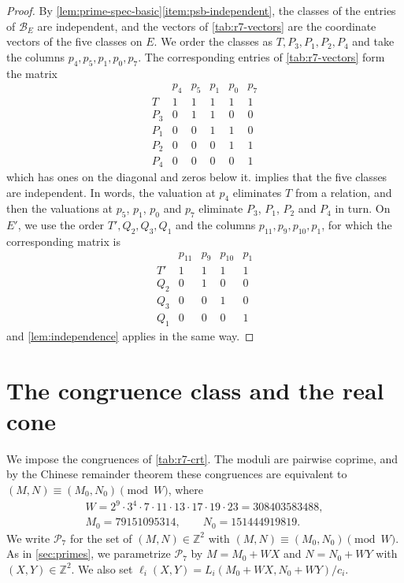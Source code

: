\documentclass[12pt,oneside,openany]{book}
\theoremstyle{definition}
\theoremstyle{plain}
\numberwithin{equation}{chapter}
\theoremstyle{plain}
\theoremstyle{definition}
\theoremstyle{remark}
\newcommand{\Z}{\mathbb Z}
\newcommand{\cB}{\mathcal B}
\newcommand{\cP}{\mathcal P}
\begin{document}
\begin{proof}
By \cref{lem:prime-spec-basic}\ref{item:psb-independent}, the classes of
the entries of $\cB_E$ are independent, and the vectors of
\cref{tab:r7-vectors} are the coordinate vectors of the five classes on
$E$. We order the classes as $T,P_3,P_1,P_2,P_4$ and take the columns
$p_4,p_5,p_1,p_0,p_7$. The
corresponding entries of \cref{tab:r7-vectors} form the matrix
\[
\begin{array}{c|ccccc}
 & p_4 & p_5 & p_1 & p_0 & p_7\\\hline
 T & 1 & 1 & 1 & 1 & 1\\
 P_3 & 0 & 1 & 1 & 0 & 0\\
 P_1 & 0 & 0 & 1 & 1 & 0\\
 P_2 & 0 & 0 & 0 & 1 & 1\\
 P_4 & 0 & 0 & 0 & 0 & 1
\end{array}
\]
which has ones on the diagonal and zeros below it. 
implies that the five classes are independent. In words, the valuation at
$p_4$ eliminates $T$ from a relation, and then the valuations at $p_5$,
$p_1$, $p_0$ and $p_7$ eliminate $P_3$, $P_1$, $P_2$ and $P_4$ in turn. On $E'$,
we use the order $T',Q_2,Q_3,Q_1$ and the columns $p_{11},p_9,p_{10},p_1$,
for which the corresponding matrix is
\[
\begin{array}{c|cccc}
 & p_{11} & p_9 & p_{10} & p_1\\\hline
 T' & 1 & 1 & 1 & 1\\
 Q_2 & 0 & 1 & 0 & 0\\
 Q_3 & 0 & 0 & 1 & 0\\
 Q_1 & 0 & 0 & 0 & 1
\end{array}
\]
and \cref{lem:independence} applies in the same way.
\end{proof}

\section{The congruence class and the real cone}\label{sec:r7-progression}

We impose the congruences of \cref{tab:r7-crt}. The moduli are pairwise
coprime, and by the Chinese remainder theorem these congruences are
equivalent to $(M,N)\equiv(M_0,N_0)\pmod W$, where
\begin{equation}\label{r7:crt}
\begin{gathered}
 W=2^9\cdot3^4\cdot7\cdot11\cdot13\cdot17\cdot19\cdot23=308403583488,\\
 M_0=79151095314,\qquad N_0=151444919819.
\end{gathered}
\end{equation}
We write $\cP_7$ for the set of $(M,N)\in\Z^2$ with
$(M,N)\equiv(M_0,N_0)\pmod W$. As in \cref{sec:primes}, we parametrize
$\cP_7$ by $M=M_0+WX$ and $N=N_0+WY$ with $(X,Y)\in\Z^2$. We also set
$\ell_i(X,Y)=L_i(M_0+WX,N_0+WY)/c_i$.
\end{document}
